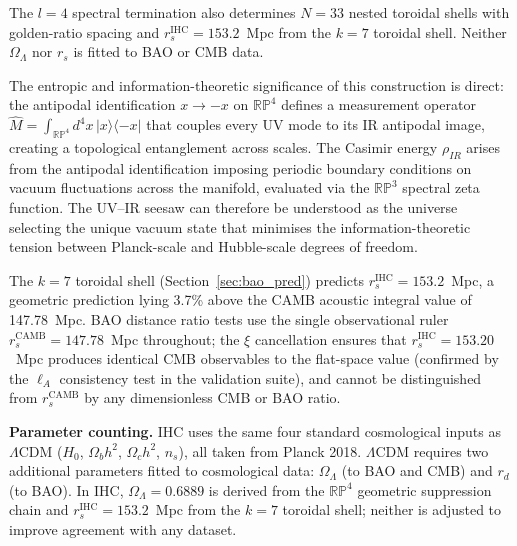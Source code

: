 \documentclass[12pt,a4paper]{article}
\begin{document}
The $l = 4$ spectral termination also determines $N = 33$ nested toroidal shells
with golden-ratio spacing and $r_s^\mathrm{IHC} = 153.2$~Mpc from the $k = 7$
toroidal shell. Neither $\Omega_\Lambda$ nor $r_s$ is fitted to BAO or CMB data.

The entropic and information-theoretic significance of this construction is direct:
the antipodal identification $x \to -x$ on $\mathbb{RP}^4$ defines a measurement operator
$\hat{M} = \int_{\mathbb{RP}^4} d^4x\, |x\rangle\langle -x|$ that couples every
UV mode to its IR antipodal image, creating a topological entanglement across scales.
The Casimir energy $\rho_{IR}$ arises from the antipodal identification imposing
periodic boundary conditions on vacuum fluctuations across the manifold,
evaluated via the $\mathbb{RP}^3$ spectral zeta function. The UV--IR seesaw can therefore be understood as the universe selecting
the unique vacuum state that minimises the information-theoretic tension between
Planck-scale and Hubble-scale degrees of freedom.

The $k=7$ toroidal shell (Section~\ref{sec:bao_pred}) predicts $r_s^\mathrm{IHC} = 153.2$~Mpc, a geometric prediction lying
3.7\% above the CAMB acoustic integral value of 147.78~Mpc. BAO distance ratio tests use the
single observational ruler $r_s^\mathrm{CAMB} = 147.78$~Mpc throughout; the
$\xi$ cancellation ensures that $r_s^\mathrm{IHC} = 153.20$~Mpc produces identical
CMB observables to the flat-space value (confirmed by the $\ell_A$ consistency test
in the validation suite), and cannot be distinguished from $r_s^\mathrm{CAMB}$ by any
dimensionless CMB or BAO ratio.

\textbf{Parameter counting.} IHC uses the same four standard cosmological inputs as
$\Lambda$CDM ($H_0$, $\Omega_b h^2$, $\Omega_c h^2$, $n_s$), all taken from Planck
2018. $\Lambda$CDM requires two additional parameters fitted to cosmological data:
$\Omega_\Lambda$ (to BAO and CMB) and $r_d$ (to BAO). In IHC, $\Omega_\Lambda = 0.6889$
is derived from the $\mathbb{RP}^4$ geometric suppression chain and
$r_s^\mathrm{IHC} = 153.2$~Mpc from the $k=7$ toroidal shell; neither is adjusted to
improve agreement with any dataset.
\end{document}
